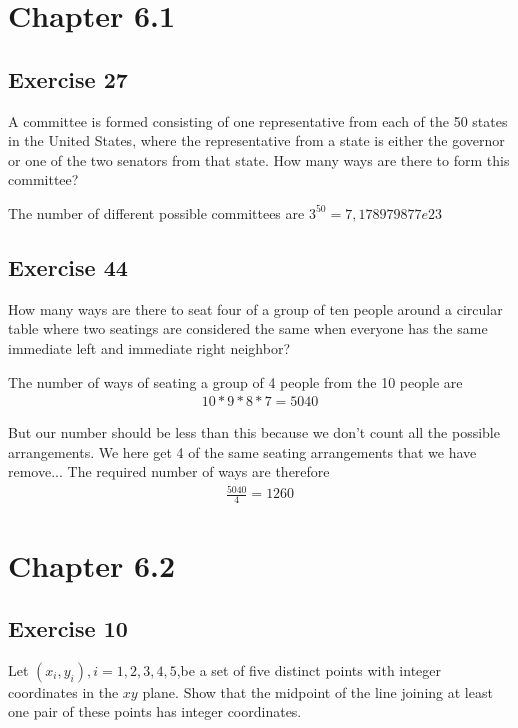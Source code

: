 \documentclass[12pt]{article}
\begin{document}
    \section{Chapter 6.1}
    \subsection{Exercise 27}
    A committee is formed consisting of one representative from each of the 50 states in the United States, where the representative from a state is either the governor or one of the two senators from that state. How many ways are there to form this committee?

    The number of different possible committees are $3^{50}=7,178979877e23$

    \subsection{Exercise 44}
    How many ways are there to seat four of a group of ten people around a circular table where two seatings are considered the same when everyone has the same immediate left and immediate right neighbor?

    The number of ways of seating a group of 4 people from the 10 people are
    \begin{equation}
      \begin{split}
        10*9*8*7 =5040
      \end{split}
    \end{equation}

    But our number should be less than this because we don't count all the possible arrangements. We here get 4 of the same seating arrangements that we have remove...
    The required number of ways are therefore
    \begin{equation}
      \begin{split}
        \frac{5040}{4}=1260
      \end{split}
    \end{equation}

    \section{Chapter 6.2}
    \subsection{Exercise 10}
    Let $(x_i,y_i), i = 1,2,3,4,5$,be a set of five distinct points with integer coordinates in the $xy$ plane. Show that the midpoint of the line joining at least one pair of these points has integer coordinates.
\end{document}
